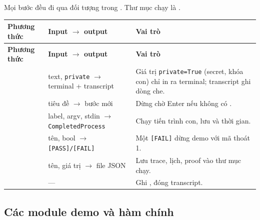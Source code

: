 \documentclass[11pt,a4paper]{article}
\begin{document}
Mọi bước đều đi qua đối tượng  trong . Thư mục
chạy là .

\begin{longtable}{P{.27\textwidth}P{.3\textwidth}P{.34\textwidth}}
\toprule\textbf{Phương thức} & \textbf{Input $\to$ output} & \textbf{Vai trò} \\
\midrule\endfirsthead
\toprule\textbf{Phương thức} & \textbf{Input $\to$ output} & \textbf{Vai trò} \\
\midrule\endhead
{} & text, \texttt{private} $\to$ terminal + transcript & Giá trị \texttt{private=True} (secret, khóa con) chỉ in ra terminal; transcript ghi dòng che. \\
 & tiêu đề $\to$ bước mới & Dừng chờ Enter nếu không có . \\
 & label, argv, stdin $\to$ \texttt{CompletedProcess} & Chạy tiến trình con, lưu  và thời gian. \\
 & tên, bool $\to$ \texttt{[PASS]/[FAIL]} & Một \texttt{[FAIL]} dừng demo với mã thoát 1. \\
 & tên, giá trị $\to$ file JSON & Lưu trace, lịch, proof vào thư mục chạy. \\
 & --- & Ghi , đóng transcript. \\
\bottomrule\end{longtable}

\subsection{Các module demo và hàm chính}
\end{document}
